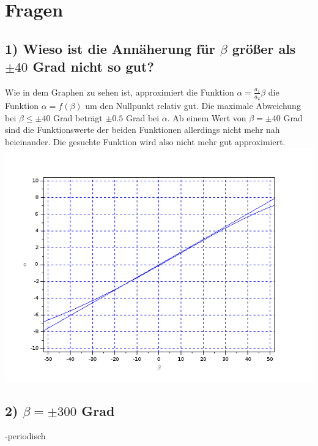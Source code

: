 \section{Fragen}
\subsection{1) Wieso ist die Annäherung für $\beta$ größer als $\pm40$ Grad nicht so gut?}
Wie in dem Graphen zu sehen ist, approximiert die Funktion $\alpha=\frac{a_1}{a_2}\beta$ die Funktion $\alpha=f(\beta)$ um den Nullpunkt relativ gut. Die maximale Abweichung bei $\beta\leq\pm 40$ Grad beträgt $\pm 0.5$ Grad bei $\alpha$. Ab einem Wert von $\beta = \pm 40$ Grad sind die Funktionswerte der beiden Funktionen allerdings nicht mehr nah beieinander. Die gesuchte Funktion wird also nicht mehr gut approximiert.\\
\includegraphics[scale=0.5]{images/plot1.png}

\subsection{2) $\beta = \pm 300$ Grad}
-periodisch